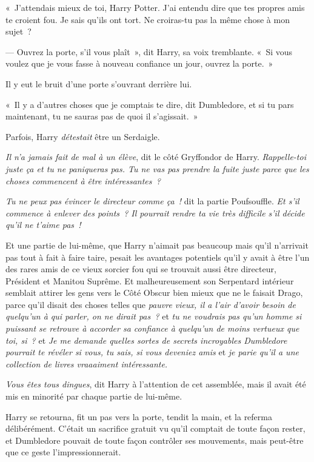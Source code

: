 «~J'attendais mieux de toi, Harry Potter.
J'ai entendu dire que tes propres amis te croient fou.
Je sais qu'ils ont tort.
Ne croiras-tu pas la même chose à mon sujet~?

--- Ouvrez la porte, s'il vous plaît~», dit Harry, sa voix tremblante.
«~Si vous voulez que je vous fasse à nouveau confiance un jour, ouvrez la porte.~»

Il y eut le bruit d'une porte s'ouvrant derrière lui.

«~Il y a d'autres choses que je comptais te dire, dit Dumbledore, et si tu pars maintenant, tu ne sauras pas de quoi il s'agissait.~»

Parfois, Harry \emph{détestait} être un Serdaigle.

\emph{Il n'a jamais fait de mal à un élève}, dit le côté Gryffondor de Harry.
\emph{Rappelle-toi juste ça et tu ne paniqueras pas.
Tu ne vas pas prendre la fuite juste parce que les choses commencent à être intéressantes~?}

\emph{Tu ne peux pas évincer le directeur comme ça~!} dit la partie Poufsouffle.
\emph{Et s'il commence à enlever des points~?
Il pourrait rendre ta vie très difficile s'il décide qu'il ne t'aime pas~!}

Et une partie de lui-même, que Harry n'aimait pas beaucoup mais qu'il n'arrivait pas tout à fait à faire taire, pesait les avantages potentiels qu'il y avait à être l'un des rares amis de ce vieux sorcier fou qui se trouvait aussi être directeur, Président et Manitou Suprême.
Et malheureusement son Serpentard intérieur semblait attirer les gens vers le Côté Obscur bien mieux que ne le faisait Drago, parce qu'il disait des choses telles que \emph{pauvre vieux, il a l'air d'avoir besoin de quelqu'un à qui parler, on ne dirait pas~?} et \emph{tu ne voudrais pas qu'un homme si puissant se retrouve à accorder sa confiance à quelqu'un de moins vertueux que toi, si~?} et \emph{Je me demande quelles sortes de secrets incroyables Dumbledore pourrait te révéler si vous, tu sais, si vous deveniez amis} et \emph{je parie qu'il a une collection de livres vraaaiment intéressante.}

\emph{Vous êtes tous dingues}, dit Harry à l'attention de cet assemblée, mais il avait été mis en minorité par chaque partie de lui-même.

Harry se retourna, fit un pas vers la porte, tendit la main, et la referma délibérément.
C'était un sacrifice gratuit vu qu'il comptait de toute façon rester, et Dumbledore pouvait de toute façon contrôler ses mouvements, mais peut-être que ce geste l'impressionnerait.

